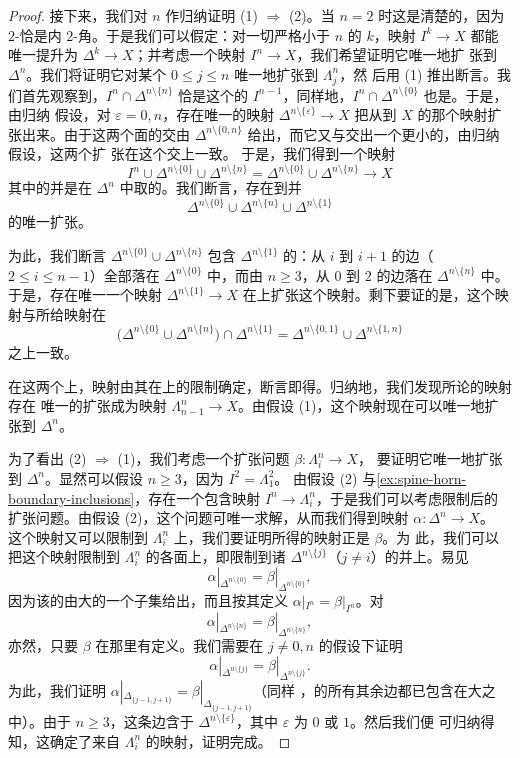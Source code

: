 \begin{proof}
接下来，我们对 $n$ 作归纳证明 (1) $\Rightarrow$ (2)。当 $n = 2$ 时这是清楚的，因为
$2$-\trSpine{}恰是内 $2$-角。于是我们可以假定：对一切严格小于 $n$ 的 $k$，映射 $I^k \to X$
都能唯一提升为 $\Delta^k \to X$；并考虑一个映射 $I^n \to X$，我们希望证明它唯一地扩
张到 $\Delta^n$。我们将证明它对某个 $0 \le j \le n$ 唯一地扩张到 $\Lambda^n_j$，然
后用 (1) 推出断言。我们首先观察到，$I^n \cap \Delta^{n\setminus\{n\}}$ 恰是这个\trSimplex{}的%
\trSpine{} $I^{n-1}$，同样地，$I^n \cap \Delta^{n\setminus\{0\}}$ 也是\trSpine{}。于是，由归纳
假设，对 $\varepsilon = 0, n$，存在唯一的映射 $\Delta^{n\setminus\{\varepsilon\}} \to X$
把从\trSpine{}到 $X$ 的那个映射扩张出来。由于这两个面的交由
$\Delta^{n\setminus\{0,n\}}$ 给出，而它又与\trSpine{}交出一个更小的\trSpine{}，由归纳假设，这两个扩
张在这个交上一致。
于是，我们得到一个映射
\[
I^n \cup \Delta^{n\setminus\{0\}} \cup \Delta^{n\setminus\{n\}} =
\Delta^{n\setminus\{0\}} \cup \Delta^{n\setminus\{n\}} \to X
\]
其中的并是在 $\Delta^n$ 中取的。我们断言，存在到并
\[
\Delta^{n\setminus\{0\}} \cup \Delta^{n\setminus\{n\}} \cup
\Delta^{n\setminus\{1\}}
\]
的唯一扩张。

为此，我们断言 $\Delta^{n\setminus\{0\}} \cup \Delta^{n\setminus\{n\}}$ 包含
$\Delta^{n\setminus\{1\}}$ 的\trSpine{}：从 $i$ 到 $i+1$ 的边（$2 \le i \le n-1$）全部落在
$\Delta^{n\setminus\{0\}}$ 中，而由 $n \ge 3$，从 $0$ 到 $2$ 的边落在
$\Delta^{n\setminus\{n\}}$ 中。于是，存在唯一一个映射 $\Delta^{n\setminus\{1\}} \to X$
在\trSpine{}上扩张这个映射。剩下要证的是，这个映射与所给映射在
\[
\bigl(\Delta^{n\setminus\{0\}} \cup \Delta^{n\setminus\{n\}}\bigr) \cap
\Delta^{n\setminus\{1\}} =
\Delta^{n\setminus\{0,1\}} \cup \Delta^{n\setminus\{1,n\}}
\]
之上一致。

在这两个\trSimplex{}上，映射由其在\trSpine{}上的限制确定，断言即得。归纳地，我们发现所论的映射存在
唯一的扩张成为映射 $\Lambda^n_{n-1} \to X$。由假设 (1)，这个映射现在可以唯一地扩张到
$\Delta^n$。

为了看出 (2) $\Rightarrow$ (1)，我们考虑一个扩张问题 $\beta\colon \Lambda^n_i \to X$，
要证明它唯一地扩张到 $\Delta^n$。显然可以假设 $n \ge 3$，因为 $I^2 = \Lambda^2_1$。
由假设 (2) 与\cref{ex:spine-horn-boundary-inclusions}，存在一个包含映射 $I^n \to \Lambda^n_i$，于是我们可以考虑限制后的
扩张问题。由假设 (2)，这个问题可唯一求解，从而我们得到映射 $\alpha\colon \Delta^n \to X$。
这个映射又可以限制到 $\Lambda^n_i$ 上，我们要证明所得的映射正是 $\beta$。为
此，我们可以把这个映射限制到 $\Lambda^n_i$ 的各面上，即限制到诸
$\Delta^{n\setminus\{j\}}$（$j \neq i$）的并上。易见
\[
\alpha|_{\Delta^{n\setminus\{0\}}} = \beta|_{\Delta^{n\setminus\{0\}}},
\]
因为该\trSimplex{}的\trSpine{}由大\trSpine{}的一个子集给出，而且按其定义 $\alpha|_{I^n} = \beta|_{I^n}$。对
\[
\alpha|_{\Delta^{n\setminus\{n\}}} = \beta|_{\Delta^{n\setminus\{n\}}},
\]
亦然，只要 $\beta$ 在那里有定义。我们需要在 $j \neq 0, n$ 的假设下证明
\[
\alpha|_{\Delta^{n\setminus\{j\}}} = \beta|_{\Delta^{n\setminus\{j\}}}.
\]
为此，我们证明 $\alpha|_{\Delta_{\{j-1,j+1\}}} = \beta|_{\Delta_{\{j-1,j+1\}}}$（同样
，\trSpine{}的所有其余边都已包含在大\trSpine{}之中）。由于 $n \ge 3$，这条边含于
$\Delta^{n\setminus\{\varepsilon\}}$，其中 $\varepsilon$ 为 $0$ 或 $1$。然后我们便
可归纳得知，这确定了来自 $\Lambda^n_i$ 的映射，证明完成。
\end{proof}

